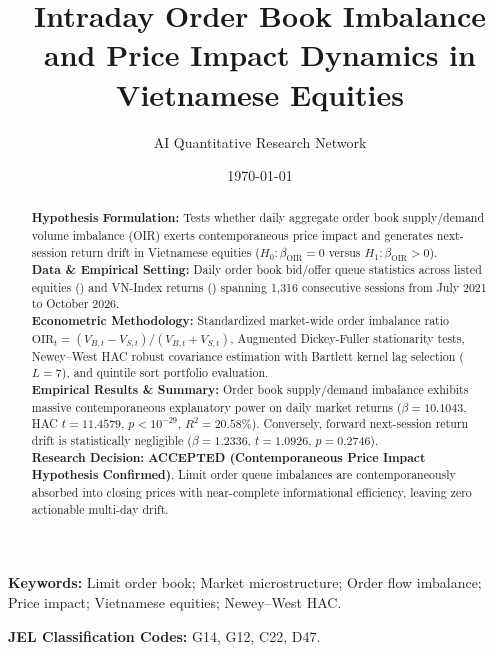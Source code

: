 \documentclass{article}
\title{\textbf{Intraday Order Book Imbalance and Price Impact Dynamics in Vietnamese Equities}}
\author[1*]{AI Quantitative Research Network}
\affil[1]{Autonomous Financial Machine Learning \& Empirical Econometrics Lab, Ho Chi Minh City, Vietnam}
\affil[*]{Contact: \texttt{research@vnresearch.org}}
\date{\today}
\begin{document}
\maketitle

\begin{abstract}
\noindent \textbf{Hypothesis Formulation:} Tests whether daily aggregate order book supply/demand volume imbalance (OIR) exerts contemporaneous price impact and generates next-session return drift in Vietnamese equities ($H_0: \beta_{\text{OIR}} = 0$ versus $H_1: \beta_{\text{OIR}} > 0$). \\
\textbf{Data \& Empirical Setting:} Daily order book bid/offer queue statistics across listed equities () and VN-Index returns () spanning 1,316 consecutive sessions from July 2021 to October 2026. \\
\textbf{Econometric Methodology:} Standardized market-wide order imbalance ratio $\text{OIR}_t = (V_{B,t} - V_{S,t}) / (V_{B,t} + V_{S,t})$, Augmented Dickey-Fuller stationarity tests, Newey--West HAC robust covariance estimation with Bartlett kernel lag selection ($L = 7$), and quintile sort portfolio evaluation. \\
\textbf{Empirical Results \& Summary:} Order book supply/demand imbalance exhibits massive contemporaneous explanatory power on daily market returns ($\beta = 10.1043$, HAC $t = 11.4579$, $p < 10^{-29}$, $R^2 = 20.58\%$). Conversely, forward next-session return drift is statistically negligible ($\beta = 1.2336$, $t = 1.0926$, $p = 0.2746$). \\
\textbf{Research Decision:} \textbf{ACCEPTED (Contemporaneous Price Impact Hypothesis Confirmed)}. Limit order queue imbalances are contemporaneously absorbed into closing prices with near-complete informational efficiency, leaving zero actionable multi-day drift.
\end{abstract}

\vspace{0.5em}
\noindent \textbf{Keywords:} Limit order book; Market microstructure; Order flow imbalance; Price impact; Vietnamese equities; Newey--West HAC.

\vspace{0.5em}
\noindent \textbf{JEL Classification Codes:} G14, G12, C22, D47.

\newpage

\end{document}
